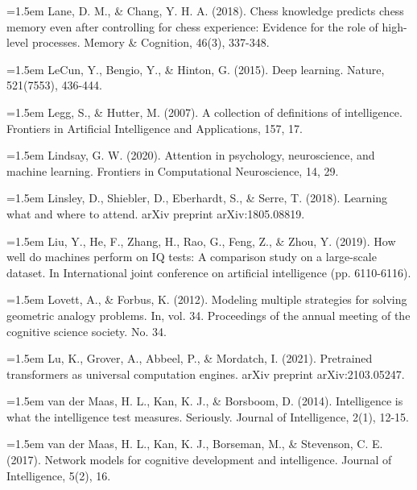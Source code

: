 \hangindent=1.5em
Lane, D. M., \& Chang, Y. H. A. (2018).
Chess knowledge predicts chess memory even after controlling
for chess experience: Evidence for the role of high-level processes.
Memory \& Cognition, 46(3), 337-348.
\par

\hangindent=1.5em
LeCun, Y., Bengio, Y., \& Hinton, G. (2015).
Deep learning.
Nature, 521(7553), 436-444.
\par

\hangindent=1.5em
Legg, S., \& Hutter, M. (2007).
A collection of definitions of intelligence.
Frontiers in Artificial Intelligence and Applications, 157, 17.
\par

\hangindent=1.5em
Lindsay, G. W. (2020).
Attention in psychology, neuroscience, and machine learning.
Frontiers in Computational Neuroscience, 14, 29.
\par

\hangindent=1.5em
Linsley, D., Shiebler, D., Eberhardt, S., \& Serre, T. (2018).
Learning what and where to attend.
arXiv preprint arXiv:1805.08819.
\par

\hangindent=1.5em
Liu, Y., He, F., Zhang, H., Rao, G., Feng, Z., \& Zhou, Y. (2019).
How well do machines perform on IQ tests:
A comparison study on a large-scale dataset.
In International joint conference on artificial intelligence
(pp. 6110-6116).
\par

\hangindent=1.5em
Lovett, A., \& Forbus, K. (2012).
Modeling multiple strategies for solving geometric analogy problems.
In, vol. 34.
Proceedings of the annual meeting of the cognitive science society.
No. 34.
\par

\hangindent=1.5em
Lu, K., Grover, A., Abbeel, P., \& Mordatch, I. (2021).
Pretrained transformers as universal computation engines.
arXiv preprint arXiv:2103.05247.
\par

\hangindent=1.5em
van der Maas, H. L., Kan, K. J., \& Borsboom, D. (2014).
Intelligence is what the intelligence test measures. Seriously.
Journal of Intelligence, 2(1), 12-15.
\par

\hangindent=1.5em
van der Maas, H. L., Kan, K. J., Borseman, M.,
\& Stevenson, C. E. (2017).
Network models for cognitive development and intelligence.
Journal of Intelligence, 5(2), 16.
\par

